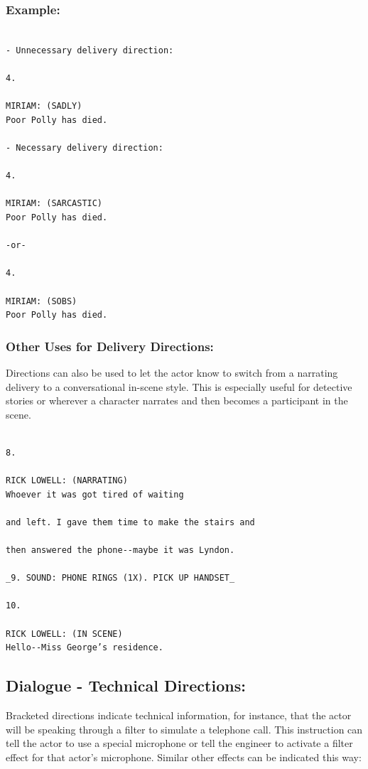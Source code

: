 \documentclass[openleft,oneside,showtrims]{memoir}
\begin{document}
\subsubsection*{Example:}
\label{sec:org8608456}

\lstset{language=fountain,label= ,caption= ,captionpos=b,numbers=none}
\begin{lstlisting}

- Unnecessary delivery direction:

4. 

MIRIAM: (SADLY)
Poor Polly has died.

- Necessary delivery direction:

4.

MIRIAM: (SARCASTIC) 
Poor Polly has died.

-or-

4.

MIRIAM: (SOBS) 
Poor Polly has died.

\end{lstlisting}

\subsubsection*{Other Uses for Delivery Directions:}
\label{sec:orga5a0321}

Directions can also be used to let the actor know to switch from a narrating delivery to a conversational in-scene style. This is especially useful for detective stories or wherever a character narrates and then becomes a participant in the scene.

\lstset{language=fountain,label= ,caption= ,captionpos=b,numbers=none}
\begin{lstlisting}

8.

RICK LOWELL: (NARRATING) 
Whoever it was got tired of waiting
  
and left. I gave them time to make the stairs and
  
then answered the phone--maybe it was Lyndon.

_9. SOUND: PHONE RINGS (1X). PICK UP HANDSET_

10.

RICK LOWELL: (IN SCENE)
Hello--Miss George’s residence.

\end{lstlisting}
\subsection{Dialogue - Technical Directions:}
\label{sec:orgbb4482d}
Bracketed directions indicate technical information, for instance, that the actor will be speaking through a filter to simulate a telephone call. This instruction can tell the actor to use a special microphone or tell the engineer to activate a filter effect for that actor's microphone. Similar other effects can be indicated this way:
\end{document}
